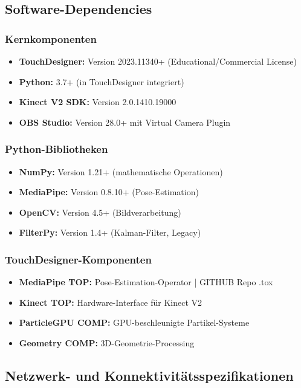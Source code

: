 \subsection{Software-Dependencies}

\subsubsection{Kernkomponenten}
\begin{itemize}
    \item \textbf{TouchDesigner:} Version 2023.11340+ (Educational/Commercial License)
    \item \textbf{Python:} 3.7+ (in TouchDesigner integriert)
    \item \textbf{Kinect V2 SDK:} Version 2.0.1410.19000
    \item \textbf{OBS Studio:} Version 28.0+ mit Virtual Camera Plugin
\end{itemize}

\subsubsection{Python-Bibliotheken}
\begin{itemize}
    \item \textbf{NumPy:} Version 1.21+ (mathematische Operationen)
    \item \textbf{MediaPipe:} Version 0.8.10+ (Pose-Estimation)
    \item \textbf{OpenCV:} Version 4.5+ (Bildverarbeitung)
    \item \textbf{FilterPy:} Version 1.4+ (Kalman-Filter, Legacy)
\end{itemize}

\subsubsection{TouchDesigner-Komponenten}
\begin{itemize}
    \item \textbf{MediaPipe TOP:} Pose-Estimation-Operator | GITHUB Repo .tox
    \item \textbf{Kinect TOP:} Hardware-Interface für Kinect V2
    \item \textbf{ParticleGPU COMP:} GPU-beschleunigte Partikel-Systeme
    \item \textbf{Geometry COMP:} 3D-Geometrie-Processing
\end{itemize}

\subsection{Netzwerk- und Konnektivitätsspezifikationen}

